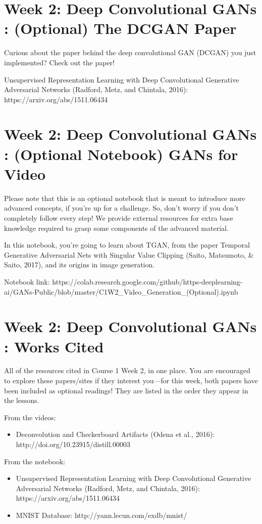\documentclass[11pt, onecolumn]{article}
\begin{document}
\begin{itemize}
\section{Week 2: Deep Convolutional GANs : (Optional) The DCGAN Paper}
Curious about the paper behind the deep convolutional GAN (DCGAN) you just implemented? Check out the paper!

Unsupervised Representation Learning with Deep Convolutional Generative Adversarial Networks (Radford, Metz, and Chintala, 2016): https://arxiv.org/abs/1511.06434

\section{Week 2: Deep Convolutional GANs : (Optional Notebook) GANs for Video}
Please note that this is an optional notebook that is meant to introduce more advanced concepts, if you're up for a challenge. So, don't worry if you don't completely follow every step! We provide external resources for extra base knowledge required to grasp some components of the advanced material.

In this notebook, you're going to learn about TGAN, from the paper Temporal Generative Adversarial Nets with Singular Value Clipping (Saito, Matsumoto, & Saito, 2017), and its origins in image generation. 

Notebook link: https://colab.research.google.com/github/https-deeplearning-ai/GANs-Public/blob/master/C1W2_Video_Generation_(Optional).ipynb


\section{Week 2: Deep Convolutional GANs : Works Cited}

All of the resources cited in Course 1 Week 2, in one place. You are encouraged to explore these papers/sites if they interest you—for this week, both papers have been included as optional readings! They are listed in the order they appear in the lessons.

From the videos: 
\begin{itemize}
\item Deconvolution and Checkerboard Artifacts (Odena et al., 2016): http://doi.org/10.23915/distill.00003
\end{itemize}

From the notebook:
\begin{itemize}
\item Unsupervised Representation Learning with Deep Convolutional Generative Adversarial Networks (Radford, Metz, and Chintala, 2016): https://arxiv.org/abs/1511.06434
\item MNIST Database: http://yann.lecun.com/exdb/mnist/
\end{itemize}


\end{itemize}
\end{document}
